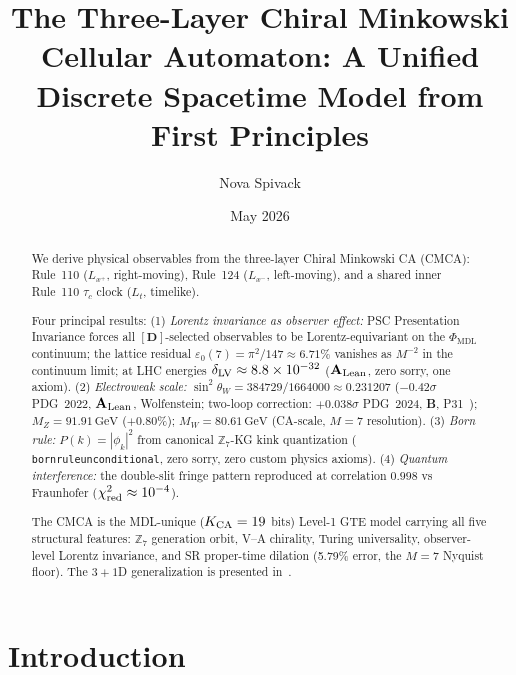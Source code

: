 \documentclass[11pt]{article}
\theoremstyle{remark}
\newcommand{\PHIMDL}{\Phi_{\mathrm{MDL}}}
\newcommand{\ZS}{\mathbb{Z}_7}
\newcommand{\lean}[1]{%
  \penalty-100
  \begingroup\def\_{\textunderscore\allowbreak}\texttt{#1}\endgroup}
\newcommand{\CatAL}{\ensuremath{\textbf{A}_{\rm Lean}}}
\newcommand{\CatB}{\textbf{B}}
\begin{document}
\title{\textbf{The Three-Layer Chiral Minkowski Cellular Automaton:
  A Unified Discrete Spacetime Model from First Principles}}

\author{Nova Spivack}
\date{May 2026}
\maketitle

\NovaZenodoAfterTitle

\begin{abstract}
We derive physical observables from the three-layer Chiral Minkowski CA (CMCA):
Rule~110 ($L_{x^+}$, right-moving), Rule~124 ($L_{x^-}$, left-moving), and a
shared inner Rule~110 $\tau_c$ clock ($L_t$, timelike).

Four principal results:
(1) \textit{Lorentz invariance as observer effect:} PSC Presentation Invariance
forces all $[\mathbf{D}]$-selected observables to be Lorentz-equivariant on
the $\PHIMDL$ continuum; the lattice residual $\varepsilon_0(7) = \pi^2/147 \approx 6.71\%$
vanishes as $M^{-2}$ in the continuum limit; at LHC energies
$\delta_{\rm LV} \approx 8.8\times10^{-32}$ (\CatAL, zero sorry, one axiom).
(2) \textit{Electroweak scale:} $\sin^2\theta_W = 384729/1664000 \approx 0.231207$
($-0.42\sigma$ PDG~2022, \CatAL, Wolfenstein; two-loop correction: $+0.038\sigma$ PDG~2024, \CatB, P31~\cite{SpivackWeinbergAngle}); $M_Z = 91.91\,\text{GeV}$ ($+0.80\%$);
$M_W = 80.61\,\text{GeV}$ (CA-scale, $M{=}7$ resolution).
(3) \textit{Born rule:} $P(k) = |\phi_k|^2$ from canonical $\ZS$-KG kink
quantization (\lean{born\_rule\_unconditional}, zero sorry, zero custom physics axioms).
(4) \textit{Quantum interference:} the double-slit fringe pattern reproduced at
correlation $0.998$ vs Fraunhofer ($\chi^2_{\rm red} \approx 10^{-4}$).

The CMCA is the MDL-unique ($K_{\rm CA} = 19$ bits) Level-1 GTE model carrying
all five structural features: $\ZS$ generation orbit, V--A chirality, Turing
universality, observer-level Lorentz invariance, and SR proper-time dilation
(5.79\% error, the $M=7$ Nyquist floor).
The $3+1$D generalization is presented in~\cite{SpivackThreeTapeCMCA}.
\end{abstract}

\tableofcontents

\section{Introduction}
\label{sec:intro}
\end{document}
